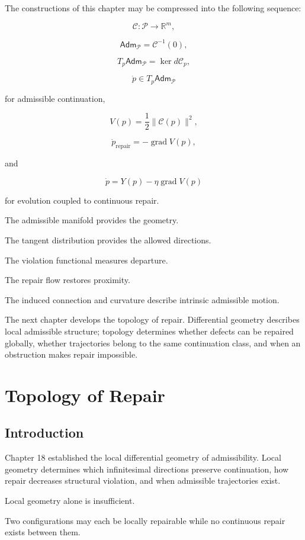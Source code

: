 \documentclass[11pt,oneside]{book}
\numberwithin{equation}{chapter}
\theoremstyle{definition}
\theoremstyle{plain}
\DeclareMathOperator{\grad}{grad}
\newcommand{\Adm}{\mathsf{Adm}}
\begin{document}
The constructions of this chapter may be compressed into the following
sequence:

\[
\mathcal C:
\mathcal P
\longrightarrow
\mathbb R^m,
\]

\[
\Adm_{\mathcal P}
=
\mathcal C^{-1}(0),
\]

\[
T_p\Adm_{\mathcal P}
=
\ker d\mathcal C_p,
\]

\[
\dot p
\in
T_p\Adm_{\mathcal P}
\]

for admissible continuation,

\[
V(p)
=
\frac12
\|\mathcal C(p)\|^2,
\]

\[
\dot p_{\mathrm{repair}}
=
-\grad V(p),
\]

and

\[
\dot p
=
Y(p)
-
\eta\grad V(p)
\]

for evolution coupled to continuous repair.

The admissible manifold provides the geometry.

The tangent distribution provides the allowed directions.

The violation functional measures departure.

The repair flow restores proximity.

The induced connection and curvature describe intrinsic admissible motion.

The next chapter develops the topology of repair. Differential geometry
describes local admissible structure; topology determines whether defects
can be repaired globally, whether trajectories belong to the same
continuation class, and when an obstruction makes repair impossible.

\chapter{Topology of Repair}

\section{Introduction}

Chapter 18 established the local differential geometry of admissibility.
Local geometry determines which infinitesimal directions preserve
continuation, how repair decreases structural violation, and when
admissible trajectories exist.

Local geometry alone is insufficient.

Two configurations may each be locally repairable while no continuous repair
exists between them.
\end{document}
